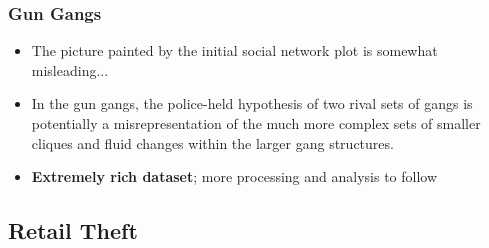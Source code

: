\documentclass[pdftex]{beamer}
\begin{document}
{ %
    \begin{frame}[plain]
     \end{frame}
}

\begin{frame}
\frametitle{Gun Gangs}
\begin{itemize}
\item The picture painted by the initial social network plot is
somewhat misleading...
\item In the gun gangs, the police-held hypothesis of two rival sets
  of gangs is potentially a misrepresentation of the much more complex
  sets of smaller cliques and fluid changes within the larger gang
  structures.
\item {\textbf{Extremely rich dataset}}; more processing and analysis to follow
\end{itemize}
\end{frame}

\subsection{Retail Theft}
\end{document}
